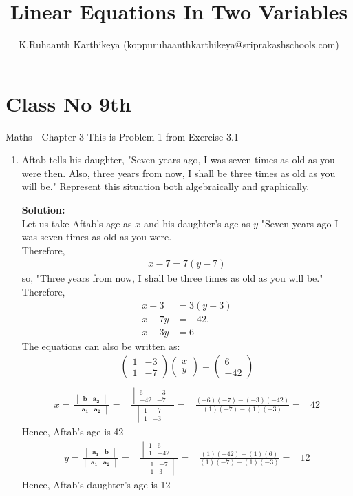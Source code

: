 \documentclass[12pt]{article}
\title{Linear Equations In Two Variables}
\author{K.Ruhaanth Karthikeya (koppuruhaanthkarthikeya@sriprakashschools.com)}
\newcommand{\myvec}[1]{\ensuremath{\begin{pmatrix}#1\end{pmatrix}}}
\newcommand{\mydet}[1]{\ensuremath{\begin{vmatrix}#1\end{vmatrix}}}
\newcommand{\solution}{\noindent \textbf{Solution: }}
\providecommand{\brak}[1]{\ensuremath{\left(#1\right)}}
\let\vec\mathbf
\begin{document}
\maketitle
\section*{Class No 9th} { Maths - Chapter 3}
This is Problem 1 from Exercise 3.1
\begin{enumerate}
\item Aftab tells his daughter, "Seven years ago,
I was seven times as old as you were then. Also, three years from 
now, I shall be three times as old as you will be." Represent this situation both algebraically and graphically.

\solution \\ Let us take Aftab's age as $x$ and his daughter's age as $y$
"Seven years ago I was seven times as old as you were.\\
Therefore,
\begin{align}
    x-7 = 7{\brak{y-7}}
\end{align}
so,
"Three years from now, I shall be three times as old as you will be."
Therefore,\\ 
\begin{align}
    x+3&= 3{\brak{y+3}}\\
x-7y &= -42. \\
x-3y&=6
\end{align}
The equations can also be written as:\\
\begin{align}
\myvec{1&-3\\1&-7}\myvec{x\\y}=\myvec{6\\-42}\\
\end{align}
\begin{align}
x =\frac{\mydet{ \vec{b} & \vec{a_2}}}{\mydet{ \vec{a_1} & \vec{a_2}}} = &
\frac{\mydet{6&-3\\-42&-7}}{ \mydet{1&-7\\1&-3}} =&
\frac{\brak{-6}\brak{-7} - \brak{-3}\brak{-42}}{\brak{1} \brak{-7}-
\brak{1}\brak{-3}} =& 42
\end{align}
Hence, Aftab's age is 42
\begin{align}
y = \frac{\mydet{ \vec{a_1} & \vec{b}}}{\mydet{ \vec{a_1} & \vec{a_2}}}=&
\frac{\mydet{1&6\\1&-42}}{ \mydet{1&-7\\1&3}}=&
\frac{\brak{1} \brak{-42} - \brak{1}\brak{6}}{\brak{1}\brak{-7} - \brak{1}\brak{-3}} =& 12
\end{align}
 Hence, Aftab's daughter's age is 12

\end{enumerate}
\end{document}
